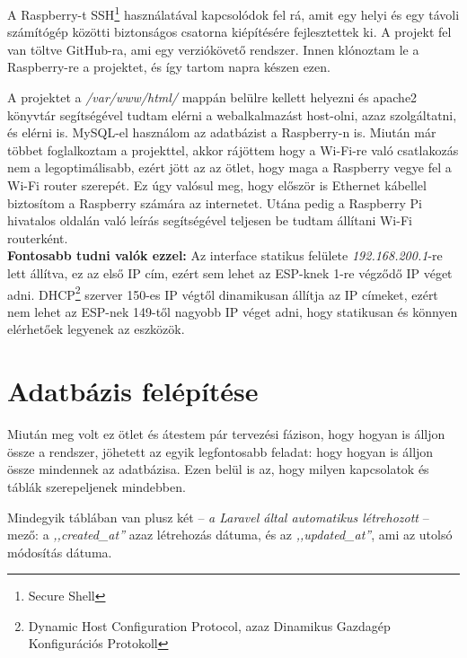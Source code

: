 \documentclass[
]{thesis-ekf}
\theoremstyle{definition}
\theoremstyle{remark}
\begin{document}
	A Raspberry-t SSH\footnote{Secure Shell} használatával kapcsolódok fel rá, amit egy helyi és egy távoli számítógép közötti biztonságos csatorna kiépítésére fejlesztettek ki.
	A projekt fel van töltve GitHub-ra\cite{github-repo}, ami egy verziókövető rendszer. Innen klónoztam le a Raspberry-re a projektet, és így tartom napra készen ezen.
	
	A projektet a \emph{/var/www/html/} mappán belülre kellett helyezni és apache2 könyvtár segítségével tudtam elérni a webalkalmazást host-olni, azaz szolgáltatni, és elérni is.
	MySQL-el használom az adatbázist a Raspberry-n is.
	Miután már többet foglalkoztam a projekttel, akkor rájöttem hogy a Wi-Fi-re való csatlakozás nem a legoptimálisabb, ezért jött az az ötlet, hogy maga a Raspberry vegye fel a Wi-Fi router szerepét. Ez úgy valósul meg, hogy először is Ethernet kábellel biztosítom a Raspberry számára az internetet. Utána pedig a Raspberry Pi hivatalos oldalán való leírás\cite{raspberry-as-wifi} segítségével teljesen be tudtam állítani Wi-Fi routerként.\\
	\textbf{Fontosabb tudni valók ezzel:}
	Az interface statikus felülete \emph{192.168.200.1}-re lett állítva, ez az első IP cím, ezért sem lehet az ESP-knek 1-re végződő IP véget adni. DHCP\footnote{Dynamic Host Configuration Protocol, azaz Dinamikus Gazdagép Konfigurációs Protokoll} szerver 150-es IP végtől dinamikusan állítja az IP címeket, ezért nem lehet az ESP-nek 149-től nagyobb IP véget adni, hogy statikusan és könnyen elérhetőek legyenek az eszközök.
	
	\section{Adatbázis felépítése}\label{database}
	
	Miután meg volt ez ötlet és átestem pár tervezési fázison, hogy hogyan is álljon össze a rendszer, jöhetett az egyik legfontosabb feladat: hogy hogyan is álljon össze mindennek az adatbázisa. Ezen belül is az, hogy milyen kapcsolatok és táblák szerepeljenek mindebben.
	
	Mindegyik táblában van plusz két -- \emph{a Laravel által automatikus létrehozott} -- mező: a \emph{,,created\_at''} azaz létrehozás dátuma, és az \emph{,,updated\_at''}, ami az utolsó módosítás dátuma.
	
\end{document}
